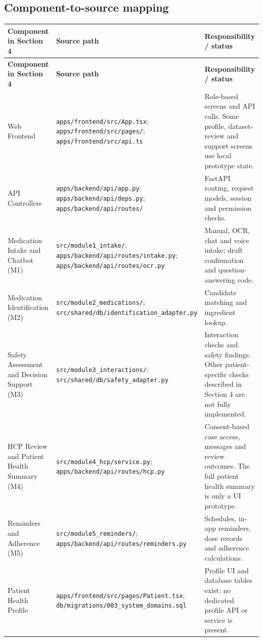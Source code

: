 \documentclass[10pt,letterpaper]{article}
\newenvironment{updated}{\par\color{pafourblue}}{\par}
\newcommand{\sourcefile}[1]{\nolinkurl{#1}}
\begin{document}
\begin{updated}
\subsection{Component-to-source mapping}
\begingroup\small
\setlength{\tabcolsep}{4pt}
\begin{longtable}{|L{0.265\textwidth}|L{0.325\textwidth}|L{0.32\textwidth}|}
\hline
\textbf{Component in Section 4} & \textbf{Source path} & \textbf{Responsibility / status} \\ \hline
\endfirsthead
\hline
\textbf{Component in Section 4} & \textbf{Source path} & \textbf{Responsibility / status} \\ \hline
\endhead
Web Frontend & \sourcefile{apps/frontend/src/App.tsx}; \sourcefile{apps/frontend/src/pages/}; \sourcefile{apps/frontend/src/api.ts} & Role-based screens and API calls. Some profile, dataset-review and support screens use local prototype state. \\ \hline
API Controllers & \sourcefile{apps/backend/api/app.py}; \sourcefile{apps/backend/api/deps.py}; \sourcefile{apps/backend/api/routes/} & FastAPI routing, request models, session and permission checks. \\ \hline
Medication Intake and Chatbot (M1) & \sourcefile{src/module1_intake/}; \sourcefile{apps/backend/api/routes/intake.py}; \sourcefile{apps/backend/api/routes/ocr.py} & Manual, OCR, chat and voice intake; draft confirmation and question-answering code. \\ \hline
Medication Identification (M2) & \sourcefile{src/module2_medications/}; \sourcefile{src/shared/db/identification_adapter.py} & Candidate matching and ingredient lookup. \\ \hline
Safety Assessment and Decision Support (M3) & \sourcefile{src/module3_interactions/}; \sourcefile{src/shared/db/safety_adapter.py} & Interaction checks and safety findings. Other patient-specific checks described in Section 4 are not fully implemented. \\ \hline
HCP Review and Patient Health Summary (M4) & \sourcefile{src/module4_hcp/service.py}; \sourcefile{apps/backend/api/routes/hcp.py} & Consent-based case access, messages and review outcomes. The full patient health summary is only a UI prototype. \\ \hline
Reminders and Adherence (M5) & \sourcefile{src/module5_reminders/}; \sourcefile{apps/backend/api/routes/reminders.py} & Schedules, in-app reminders, dose records and adherence calculations. \\ \hline
Patient Health Profile & \sourcefile{apps/frontend/src/pages/Patient.tsx}; \sourcefile{db/migrations/003_system_domains.sql} & Profile UI and database tables exist; no dedicated profile API or service is present. \\ \hline

\end{longtable}
\end{updated}
\end{document}
